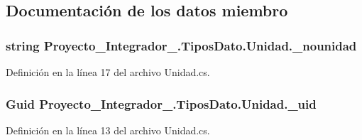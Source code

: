 \subsection{Documentación de los datos miembro}
\hypertarget{class_proyecto___integrador__3_1_1_tipos_dato_1_1_unidad_a02a3cfd664234b1c90c4ea2749928ac2}{
\subsubsection[{\-\_\-nounidad}]{\setlength{\rightskip}{0pt plus 5cm}string Proyecto\-\_\-\-Integrador\-\_.\-Tipos\-Dato.\-Unidad.\-\_\-nounidad\hspace{0.3cm}{\ttfamily [private]}}}\label{class_proyecto___integrador__3_1_1_tipos_dato_1_1_unidad_a02a3cfd664234b1c90c4ea2749928ac2}


Definición en la línea 17 del archivo Unidad.\-cs.

\hypertarget{class_proyecto___integrador__3_1_1_tipos_dato_1_1_unidad_ad0a5b9c3770801a5e32f52d7406346d8}{
\subsubsection[{\-\_\-uid}]{\setlength{\rightskip}{0pt plus 5cm}Guid Proyecto\-\_\-\-Integrador\-\_.\-Tipos\-Dato.\-Unidad.\-\_\-uid\hspace{0.3cm}{\ttfamily [private]}}}\label{class_proyecto___integrador__3_1_1_tipos_dato_1_1_unidad_ad0a5b9c3770801a5e32f52d7406346d8}


Definición en la línea 13 del archivo Unidad.\-cs.



